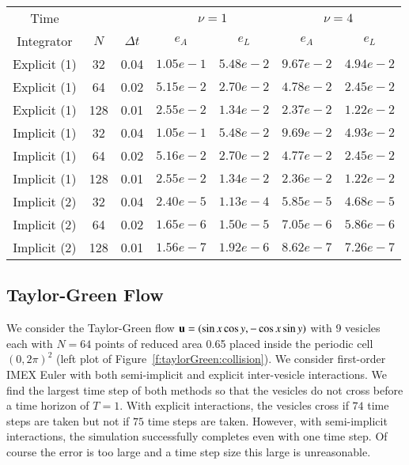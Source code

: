 \begin{table}[htp]
\begin{tabular}{ccc|cc|cc} 
Time & & & \multicolumn{2}{c|}{$\nu=1$} & \multicolumn{2}{c}{$\nu=4$} \\
Integrator   & $N$ & $\Delta t$ & $e_{A}$   & $e_{L}$   & 
$e_{A}$   & $e_{L}$ \\ 
\hline

Explicit (1) & 32  & 0.04       & $1.05e-1$ & $5.48e-2$ &
$9.67e-2$ & $4.94e-2$ \\ 

Explicit (1) & 64  & 0.02       & $5.15e-2$ & $2.70e-2$ &
$4.78e-2$ & $2.45e-2$ \\ 

Explicit (1) & 128 & 0.01       & $2.55e-2$ & $1.34e-2$ &
$2.37e-2$ & $1.22e-2$ \\ 
\hline

Implicit (1) & 32  & 0.04       & $1.05e-1$ & $5.48e-2$ &
$9.69e-2$ & $4.93e-2$ \\ 

Implicit (1) & 64  & 0.02       & $5.16e-2$ & $2.70e-2$ &
$4.77e-2$ & $2.45e-2$ \\ 

Implicit (1) & 128 & 0.01       & $2.55e-2$ & $1.34e-2$ &
$2.36e-2$ & $1.22e-2$ \\ 
\hline

Implicit (2) & 32  & 0.04       & $2.40e-5$ & $1.13e-4$ &
$5.85e-5$ & $4.68e-5$ \\ 

Implicit (2) & 64  & 0.02       & $1.65e-6$ & $1.50e-5$ &
$7.05e-6$ & $5.86e-6$ \\ 

Implicit (2) & 128 & 0.01       & $1.56e-7$ & $1.92e-6$ &
$8.62e-7$ & $7.26e-7$ 

\end{tabular}

\end{table}

\subsection{Taylor-Green Flow}
\label{s:taylorGreen}
We consider the Taylor-Green flow ${\mathbf{u}} = (\sin x \cos y,-\cos x \sin
y)$ with 9 vesicles each with $N=64$ points of reduced area 0.65 placed
inside the periodic cell $(0,2\pi)^{2}$ (left plot of
Figure~\ref{f:taylorGreen:collision}).  We consider first-order IMEX
Euler with both semi-implicit and explicit inter-vesicle interactions.
We find the largest time step of both methods so that the vesicles do
not cross before a time horizon of $T = 1$.  With explicit
interactions, the vesicles cross if $74$ time steps are taken but not
if $75$ time steps are taken.  However, with semi-implicit
interactions, the simulation successfully completes even with one time
step.  Of course the error is too large and a time step size this large
is unreasonable.

